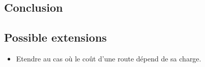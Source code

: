 \documentclass[a4paper,10pt]{article}
\begin{document}
\begin{linenumbers}
\section{Conclusion}


\subsection*{Possible extensions}
\begin{itemize}
	\item Etendre au cas où le coût d'une route dépend de sa charge.
\end{itemize}


\end{linenumbers}

\newpage



\end{document}
